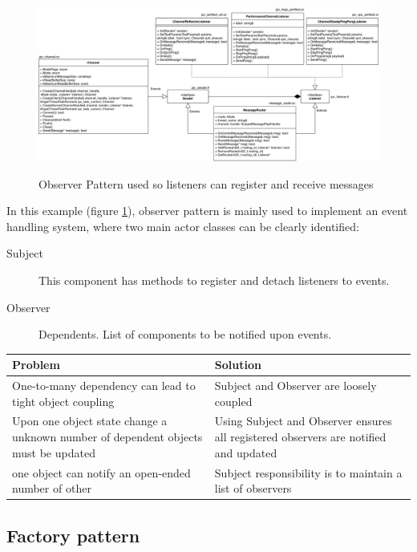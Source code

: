 \begin{figure}
    \centering
    {\includegraphics[width=\textwidth]{img/observer.png}}
    \caption{Observer Pattern used so listeners can register and receive messages}
    \label{fig:observer}
\end{figure}


In this example (figure \ref{fig:observer}), observer pattern is mainly used to implement an event handling system, where two main actor classes can be clearly identified:
\begin{description}
    \item[Subject] This component has methods to register and detach listeners to events.
    \item[Observer] Dependents. List of components to be notified upon events.
\end{description}
\begin{center}
    \begin{tabular}{p{}p{}}
    \hline
    \textbf{Problem} & \textbf{Solution} \\ \hline
    One-to-many dependency can lead to tight object coupling & Subject and Observer are loosely coupled\\ \hline
    Upon one object state change a unknown number of dependent objects must be updated & Using Subject and Observer ensures all registered observers are notified and updated\\ \hline
    one object can notify an open-ended number of other & Subject responsibility is to maintain a list of observers\\ \hline
    \end{tabular}
\end{center}

\subsection{Factory pattern}

